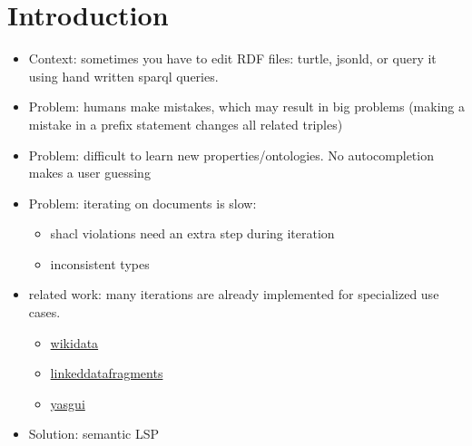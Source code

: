 \section{Introduction}%
\label{sec:introduction}

\begin{itemize}
\item Context: sometimes you have to edit RDF files: turtle, jsonld, or query it using hand written sparql queries.
\item Problem: humans make mistakes, which may result in big problems (making a mistake in a prefix statement changes all related triples)
\item Problem: difficult to learn new properties/ontologies. No autocompletion makes a user guessing
\item Problem: iterating on documents is slow: 
  \begin{itemize}
    \item shacl violations need an extra step during iteration
    \item inconsistent types
  \end{itemize}
\item related work: many iterations are already implemented for specialized use cases.
  \begin{itemize}
    \item \href{https://query.wikidata.org/}{wikidata}
    \item \href{query.linkeddatafragments.org}{linkeddatafragments}
    \item \href{https://docs.triply.cc/yasgui/}{yasgui} \cite{yasgui}
  \end{itemize}
\item Solution: semantic LSP
\end{itemize}
